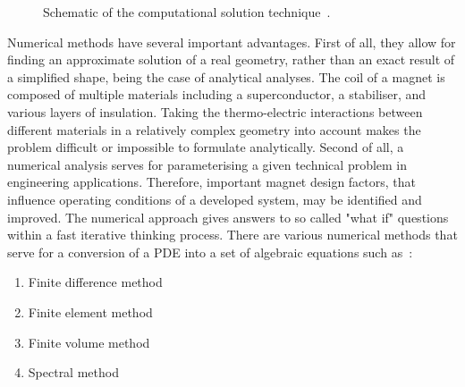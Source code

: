 \begin{figure}[H]
    \renewcommand{\baselinestretch}{0.7} 
    \centering
    \caption{Schematic of the computational solution technique~\cite{eth_introduction_to_finite_element}.}
    \label{fig:computational_solution_technique}
\end{figure}

Numerical methods have several important advantages. First of all, they allow for finding an approximate solution of a real geometry, rather than an exact result of a simplified shape, being the case of analytical analyses. The coil of a magnet is composed of multiple materials including a superconductor, a stabiliser, and various layers of insulation. Taking the thermo-electric interactions between different materials in a relatively complex geometry into account makes the problem difficult or impossible to formulate analytically. Second of all, a numerical analysis serves for parameterising a given technical problem in engineering applications. Therefore, important magnet design factors, that influence operating conditions of a developed system, may be identified and improved. The numerical approach gives answers to so called "what if" questions within a fast iterative thinking process. There are various numerical methods that serve for a conversion of a PDE into a set of algebraic equations such as~\cite{eth_introduction_to_finite_element, heat_transfer_practical_approach_cengel}: 
\begin{enumerate}
    \item Finite difference method
    \item Finite element method
    \item Finite volume method
    \item Spectral method
\end{enumerate}

